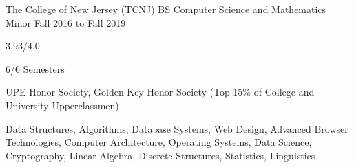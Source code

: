
\begin{cventry}
    {The College of New Jersey (TCNJ)}
    {BS Computer Science and Mathematics Minor}
    {Fall 2016 to Fall 2019}{}{}
    \begin{cvitems}
        \item{} 3.93/4.0
        \item{} 6/6 Semesters
        \item{} UPE Honor Society, Golden Key Honor Society (Top 15\% of College and University Upperclassmen)
        \item{} Data Structures, Algorithms, Database Systems, Web Design, Advanced Browser Technologies, Computer Architecture, Operating Systems, Data Science, Cryptography, Linear Algebra, Discrete Structures, Statistics, Linguistics
    \end{cvitems}
\end{cventry}
